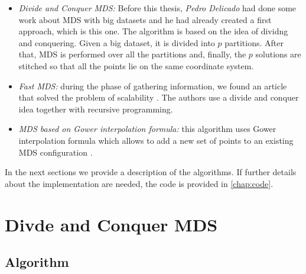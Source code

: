 \documentclass[11pt]{report}
\begin{document}
\begin{itemize}
\item \textit{Divide and Conquer MDS:} Before this thesis, 
\textit{Pedro Delicado} had done some work about  MDS with big
datasets and he had already created a first approach, which is this one. The 
algorithm is based on the idea of dividng and conquering. Given a big dataset, 
it is divided into $p$ partitions. After that, MDS is performed over all the 
partitions and, finally, the $p$ solutions are stitched so that all the points 
lie on the same coordinate system.

\item \textit{Fast MDS:} during the phase of gathering information, we found an 
article that solved the problem of scalability \cite{Yang06afast}. The 
authors  use a divide and conquer idea together with recursive programming. 

\item \textit{MDS based on Gower interpolation formula:} this algorithm uses
Gower interpolation formula which allows to add a new set of points
to an existing MDS configuration \cite{gowerformula}. 

\end{itemize}

In the next sections we provide a description of the algorithms. 
If further details about the implementation are needed, the code is provided in 
\autoref{chap:code}.

\section{Divde and Conquer MDS}
\subsection{Algorithm}
\end{document}
